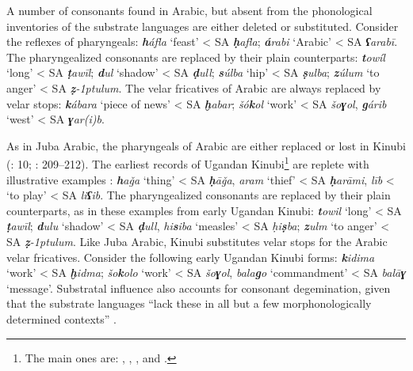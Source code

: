 \documentclass[output=paper]{langsci/langscibook}
\begin{document}
A number of consonants found in Arabic, but absent from the phonological inventories of the substrate languages are either deleted or substituted. Consider the reflexes of pharyngeals: \textit{\textbf{h}áfla} ‘feast’ < SA \textit{\textbf{ḥ}afla}; \textit{\textbf{á}rabi} ‘Arabic’ < SA \textit{\textbf{ʕ}arabī}. The pharyngealized consonants are replaced by their plain counterparts: \textit{\textbf{t}owíl} ‘long’ < SA \textit{\textbf{ṭ}awīl}; \textit{\textbf{d}ul} ‘shadow’ < SA \textit{\textbf{ḍ}ull}; \textit{\textbf{s}úlba} ‘hip’ < SA \textit{\textbf{ṣ}ulba}; \textit{\textbf{z}úlum} ‘to anger’ < SA \textit{\textbf{ẓ}\kern -1ptulum}. The velar fricatives of Arabic are always replaced by velar stops: \textit{\textbf{k}ábara} ‘piece of news’ < SA \textit{\textbf{ḫ}abar}; \textit{šó\textbf{k}ol} ‘work’ < SA \textit{šo\textbf{ɣ}ol}, \textit{\textbf{g}árib} ‘west’ < SA \textit{\textbf{ɣ}ar(i)b}. 

As in Juba Arabic, the pharyngeals of Arabic are either replaced or lost in Kinubi (\citealt{Owens1985}: 10; \citealt{Wellens2003}: 209–212). The earliest records of Ugandan Kinubi\footnote{The main ones are: \citet{Cook1905}, \citet{Jenkins1909}, \citet{Meldon1913}, and \citet{OwenKeane1915}.} are replete with illustrative examples \citep{Avram2017talk}: \textit{\textbf{h}aǧa} ‘thing’ < SA \textit{\textbf{ḥ}āǧa}, \textit{aram} ‘thief’ < SA \textit{\textbf{ḥ}arāmi}, \textit{līb} < ‘to play’ < SA \textit{li\textbf{ʕ}ib}. The pharyngealized consonants are replaced by their plain counterparts, as in these examples from early Ugandan Kinubi: \textit{\textbf{t}owil} ‘long’ < SA \textit{\textbf{ṭ}awīl}; \textit{\textbf{d}ulu} ‘shadow’ < SA \textit{\textbf{ḍ}ull}, \textit{hi\textbf{s}iba} ‘measles’ < SA \textit{ḥi\textbf{ṣ}ba}; \textit{\textbf{z}ulm} ‘to anger’ < SA \textit{\textbf{ẓ}\kern -1ptulum}. Like Juba Arabic, Kinubi substitutes velar stops for the Arabic velar fricatives. Consider the following early Ugandan Kinubi forms: \textit{\textbf{k}idima} ‘work’ < SA \textit{\textbf{ḫ}idma}; \textit{šo\textbf{k}olo} ‘work’ < SA \textit{šo\textbf{ɣ}ol}, \textit{bala\textbf{g}o} ‘commandment’ < SA \textit{balā\textbf{ɣ}} ‘message’. Substratal influence also accounts for consonant degemination, given that the substrate languages “lack these in all but a few morphonologically determined contexts” \citep[162]{Owens1997}. 
\end{document}
